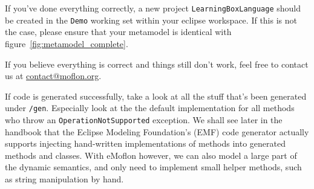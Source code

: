 If you've done everything correctly, a new project \texttt{LearningBoxLanguage} should be created in the \texttt{Demo} working set within your eclipse workspace.
If this is not the case, please ensure that your metamodel is identical with figure~\ref{fig:metamodel_complete}.

If you believe everything is correct and things still don't work, feel free to contact us at \href{mailto:contact@moflon.org}{contact@moflon.org}.

If code is generated successfully, take a look at all the stuff that's been generated under \texttt{/gen}. Especially look at the the default implementation for all methods who throw an  \texttt{OperationNotSupported} exception.
We shall see later in the handbook that the Eclipse Modeling Foundation's (EMF) code generator actually supports injecting hand-written implementations of methods into generated methods and classes.
With eMoflon however, we can also model a large part of the dynamic semantics, and only need to implement small helper methods, such as string manipulation by hand.

